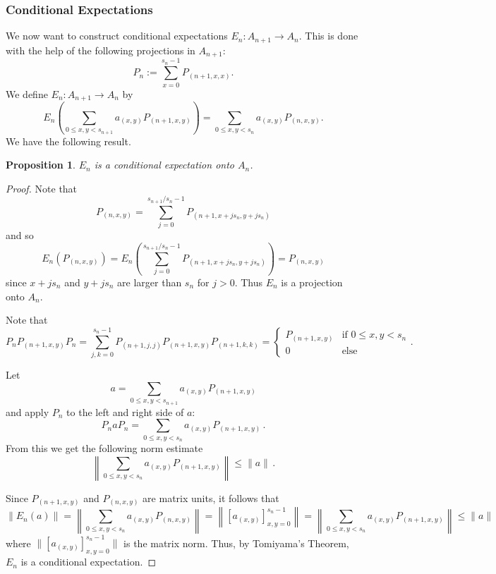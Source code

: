 \documentclass[12pt,reqno]{amsart}
\numberwithin{equation}{section}
\newtheorem{prop}[theo]{{\sc \bf Proposition}}
\begin{document}
\subsubsection{Conditional Expectations}
We now want to construct conditional expectations $E_n:A_{n+1}\to A_n$. This is done with the help of the following projections in $A_{n+1}$:
\begin{equation*}
P_n:=\sum\limits_{x=0}^{s_n-1}P_{(n+1,x,x)}.
\end{equation*}
We define $E_n:A_{n+1}\to A_n$ by
\begin{equation*}
E_n\left(\sum_{0\le x,y<s_{n+1}} a_{(x,y)}P_{(n+1,x,y)}\right) = \sum_{0\le x,y<s_n} a_{(x,y)} P_{(n,x,y)}.
\end{equation*}
We have the following result.
\begin{prop} $E_n$ is a conditional expectation onto $A_n$.
\end{prop}
\begin{proof}
Note that 
\begin{equation*}
P_{(n,x,y)}=\sum_{j=0}^{s_{n+1}/{s_n}-1} P_{(n+1,x+js_n,y+js_n)}
\end{equation*}
and so
\begin{equation*}
E_n(P_{(n,x,y)}) = E_n\left(\sum_{j=0}^{s_{n+1}/{s_n}-1} P_{(n+1,x+js_n,y+js_n)}\right) = P_{(n,x,y)}
\end{equation*}
since $x+js_n$ and $y+js_n$ are larger than $s_n$ for $j>0$.  Thus $E_n$ is a projection onto $A_n$.

Note that
\begin{equation*}
P_n P_{(n+1,x,y)} P_n = \sum_{j,k=0}^{s_n-1} P_{(n+1,j,j)} P_{(n+1,x,y)} P_{(n+1,k,k)} = \begin{cases}
P_{(n+1,x,y)} & \text{if\ } 0\le x,y<s_n \\ 0 & \text{else}\end{cases}.\end{equation*}

Let 
\begin{equation*}
a=\sum_{0\le x,y<s_{n+1}} a_{(x,y)}P_{(n+1,x,y)}
\end{equation*}
and apply $P_n$ to the left and right side of $a$:
\begin{equation*}
P_n a P_n = \sum_{0\le x,y<s_n} a_{(x,y)}P_{(n+1,x,y)}\,.
\end{equation*}
From this we get the following norm estimate
\begin{equation*}
\left\| \sum_{0\le x,y<s_n} a_{(x,y)} P_{(n+1,x,y)}\right\| \le \|a\|\,.
\end{equation*}

Since $P_{(n+1,x,y)}$ and $P_{(n,x,y)}$ are matrix units, it follows that
\begin{equation*}
\|E_n(a)\|=\left\|\sum_{0\le x,y<s_n} a_{(x,y)}P_{(n,x,y)}\right\|=\left\|[a_{(x,y)}]_{x,y=0}^{s_n-1}\right\| = \left\| \sum_{0\le x,y<s_n} a_{(x,y)} P_{(n+1,x,y)}\right\|\le\|a\|
\end{equation*}
where $\|[a_{(x,y)}]_{x,y=0}^{s_n-1}\|$ is the matrix norm. Thus, by Tomiyama's Theorem, $E_n$ is a conditional expectation. 
\end{proof}
\end{document}
